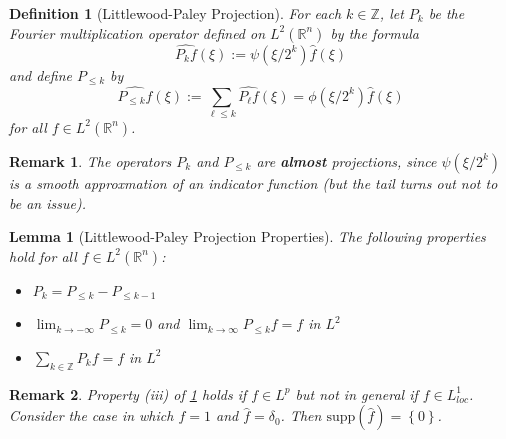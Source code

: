 \documentclass{article}
\newtheorem{definition}{Definition}
\newtheorem{lemma}{Lemma}
\newtheorem{remark}{Remark}
\def\R{\mathbb{R}} %
\def\Z{\mathbb{Z}} %
\begin{document}
\begin{definition}[Littlewood-Paley Projection]
  \label{def:littlewood-paley-projection}
  For each $k\in \Z$, let $P_{k}$ be the Fourier multiplication operator defined
  on $L^{2}(\R^{n})$ by the formula
  \begin{equation*}
    \widehat{P_{k}f}(\xi)
    := \psi \left( \xi/2^{k}\right)\hat{f}(\xi)
  \end{equation*}
  and define $P_{ \leq k}$ by
  \begin{equation*}
    \widehat{P_{ \leq k}f}(\xi) := \sum_{\ell \leq k} \widehat{P_{\ell}f}(\xi)= \phi(\xi/2^{k})\hat{f}(\xi)
  \end{equation*}
  for all $f\in L^{2}(\R^{n})$.
\end{definition}
\begin{remark}
  The operators $P_{k}$ and $P_{\leq k}$ are \textbf{almost} projections,  since
  $\psi(\xi/2^{k})$ is a smooth approxmation of an indicator function (but the
  tail turns out not to be an issue).
\end{remark}
\begin{lemma}[Littlewood-Paley Projection Properties]
  \label{lem:littlewood-paley-projection-properties}
  The following properties hold for all $f\in L^{2}(\R^n)$:
  \begin{itemize}[(i)]
    \item $P_k= P_{\leq k}-P_{\leq k-1}$ 
    \item $\lim_{k \to -\infty}P_{\leq k}=0$ and $\lim_{k \to \infty} P_{\leq
      k}f = f$ in $L^{2}$ 
    \item $\sum_{k\in \Z}P_{k}f = f$ in $L^{2}$ 
  \end{itemize}
\end{lemma}
\begin{remark}
  Property (iii) of \cref{lem:littlewood-paley-projection-properties} holds if
  $f\in L^{p}$ but not in general if $f\in L^{1}_{loc}$. Consider the case in
  which $f=1$ and $\hat{f}=\delta_{0}$. Then
  $\text{supp}(\hat{f})=\left\{0\right\}$.
\end{remark}
\end{document}
